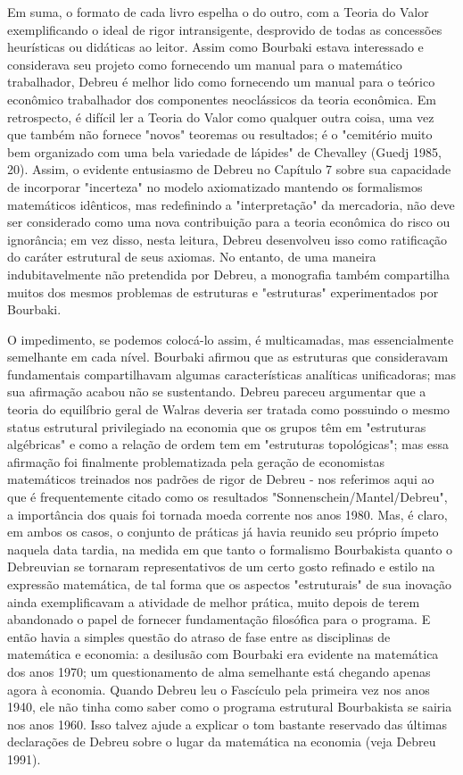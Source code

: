 \documentclass[12pt]{article}
\begin{document}
Em suma, o formato de cada livro espelha o do outro, com a Teoria do Valor exemplificando o ideal de rigor intransigente, desprovido de todas as concessões heurísticas ou didáticas ao leitor. Assim como Bourbaki estava interessado e considerava seu projeto como fornecendo um manual para o matemático trabalhador, Debreu é melhor lido como fornecendo um manual para o teórico econômico trabalhador dos componentes neoclássicos da teoria econômica. Em retrospecto, é difícil ler a Teoria do Valor como qualquer outra coisa, uma vez que também não fornece "novos" teoremas ou resultados; é o "cemitério muito bem organizado com uma bela variedade de lápides" de Chevalley (Guedj 1985, 20). Assim, o evidente entusiasmo de Debreu no Capítulo 7 sobre sua capacidade de incorporar "incerteza" no modelo axiomatizado mantendo os formalismos matemáticos idênticos, mas redefinindo a "interpretação" da mercadoria, não deve ser considerado como uma nova contribuição para a teoria econômica do risco ou ignorância; em vez disso, nesta leitura, Debreu desenvolveu isso como ratificação do caráter estrutural de seus axiomas. No entanto, de uma maneira indubitavelmente não pretendida por Debreu, a monografia também compartilha muitos dos mesmos problemas de estruturas e "estruturas" experimentados por Bourbaki.

O impedimento, se podemos colocá-lo assim, é multicamadas, mas essencialmente semelhante em cada nível. Bourbaki afirmou que as estruturas que consideravam fundamentais compartilhavam algumas características analíticas unificadoras; mas sua afirmação acabou não se sustentando. Debreu pareceu argumentar que a teoria do equilíbrio geral de Walras deveria ser tratada como possuindo o mesmo status estrutural privilegiado na economia que os grupos têm em "estruturas algébricas" e como a relação de ordem tem em "estruturas topológicas"; mas essa afirmação foi finalmente problematizada pela geração de economistas matemáticos treinados nos padrões de rigor de Debreu - nos referimos aqui ao que é frequentemente citado como os resultados "Sonnenschein/Mantel/Debreu", a importância dos quais foi tornada moeda corrente nos anos 1980. Mas, é claro, em ambos os casos, o conjunto de práticas já havia reunido seu próprio ímpeto naquela data tardia, na medida em que tanto o formalismo Bourbakista quanto o Debreuvian se tornaram representativos de um certo gosto refinado e estilo na expressão matemática, de tal forma que os aspectos "estruturais" de sua inovação ainda exemplificavam a atividade de melhor prática, muito depois de terem abandonado o papel de fornecer fundamentação filosófica para o programa. E então havia a simples questão do atraso de fase entre as disciplinas de matemática e economia: a desilusão com Bourbaki era evidente na matemática dos anos 1970; um questionamento de alma semelhante está chegando apenas agora à economia. Quando Debreu leu o Fascículo pela primeira vez nos anos 1940, ele não tinha como saber como o programa estrutural Bourbakista se sairia nos anos 1960. Isso talvez ajude a explicar o tom bastante reservado das últimas declarações de Debreu sobre o lugar da matemática na economia (veja Debreu 1991).
\end{document}
